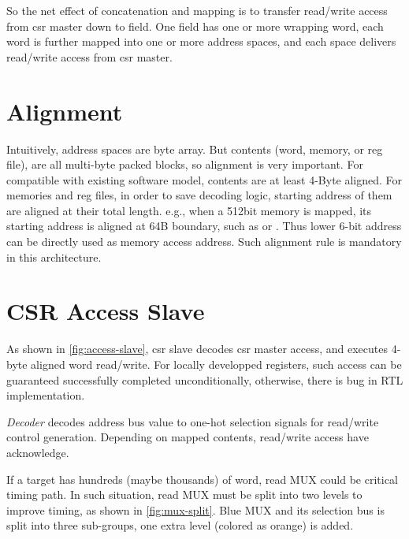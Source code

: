 \documentclass[10pt,oneside]{book}
\begin{document}
So the net effect of concatenation and mapping is to transfer read/write access
from \gls{csr master} down to \gls{field}. One \gls{field} has one or more 
wrapping \gls{word}, each \gls{word} is further mapped into one or more address
spaces, and each space delivers read/write access from \gls{csr master}.

\section{Alignment}
Intuitively, address spaces are byte array. But contents (\gls{word},
memory, or \gls{reg file}), are all multi-byte packed blocks, so
alignment is very important.  For compatible with existing software
model, contents are at least 4-Byte aligned.  For memories and
\gls{reg file}s, in order to save decoding logic, starting address of
them are aligned at their total length. e.g., when a 512bit memory is
mapped, its starting address is aligned at 64B boundary, such as
 or .  Thus lower 6-bit address can be
directly used as memory access address.  Such alignment rule is
mandatory in this architecture.

\section{CSR Access Slave}
As shown in \autoref{fig:access-slave}, \gls{csr slave} decodes \gls{csr master}
access, and executes 4-byte aligned \gls{word} read/write.
For locally developped registers, such access can be guaranteed successfully 
completed unconditionally, otherwise, there is bug in RTL implementation. 

\emph{Decoder} decodes address bus value
to one-hot selection signals for read/write control generation. Depending on 
mapped contents, read/write access have acknowledge. 

If a \gls{target} has hundreds (maybe thousands) of \gls{word}, read MUX could be
critical timing path. In such situation, read MUX must be split into two levels 
to improve timing, as shown in \autoref{fig:mux-split}. Blue MUX and its selection
bus is split into three sub-groups, one extra level (colored as orange) is added. 
\end{document}
